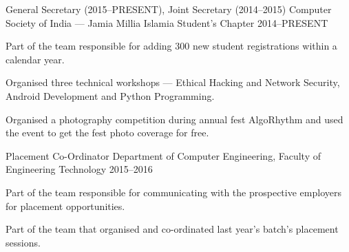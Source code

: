 
\begin{cventries}

\cventry%
  {General Secretary (2015--PRESENT), Joint Secretary (2014--2015)} %
  {Computer Society of India --- Jamia Millia Islamia Student's Chapter} %
  {} %
  {2014--PRESENT} %
  {%
    \begin{cvitems} %
      \item{Part of the team responsible for adding 300 new student
            registrations within a calendar year.}
      \item{Organised three technical workshops --- Ethical Hacking and Network
            Security, Android Development and Python Programming.}
      \item{Organised a photography competition during annual fest AlgoRhythm
            and used the event to get the fest photo coverage for free.}
    \end{cvitems}
  }

\cventry%
  {Placement Co-Ordinator} %
  {Department of Computer Engineering, Faculty of Engineering Technology} %
  {} %
  {2015--2016} %
  {%
    \begin{cvitems} %
      \item{Part of the team responsible for communicating with the
            prospective employers for placement opportunities.}
      \item{Part of the team that organised and co-ordinated last year's
            batch's placement sessions.}
    \end{cvitems}
  }


\end{cventries}
